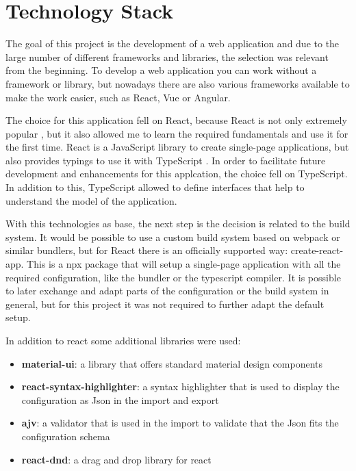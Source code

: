\section{Technology Stack}
\label{sec:tech_stack}
The goal of this project is the development of a web application and due to the large number of different frameworks and libraries, the selection was relevant from the beginning. To develop a web application you can work without a framework or library, but nowadays there are also various frameworks available to make the work easier, such as React, Vue or Angular.

The choice for this application fell on React, because React is not only extremely popular \cite{2020DeveloperSurvey}, but it also allowed me to learn the required fundamentals and use it for the first time. React is a JavaScript library to create single-page applications, but also provides typings to use it with TypeScript \cite{createReactApp}. In order to facilitate future development and enhancements for this applcation, the choice fell on TypeScript. In addition to this, TypeScript allowed to define interfaces that help to understand the model of the application.

With this technologies as base, the next step is the decision is related to the build system. It would be possible to use a custom build system based on webpack or similar bundlers, but for React there is an officially supported way: create-react-app. This is a npx package that will setup a single-page application with all the required configuration, like the bundler or the typescript compiler. It is possible to later exchange and adapt parts of the configuration or the build system in general, but for this project it was not required to further adapt the default setup.

In addition to react some additional libraries were used:

\begin{itemize}
    \item \textbf{material-ui}: a library that offers standard material design components
    \item \textbf{react-syntax-highlighter}: a syntax highlighter that is used to display the configuration as Json in the import and export 
    \item \textbf{ajv}: a validator that is used in the import to validate that the Json fits the configuration schema
    \item \textbf{react-dnd}: a drag and drop library for react
\end{itemize}

\newpage